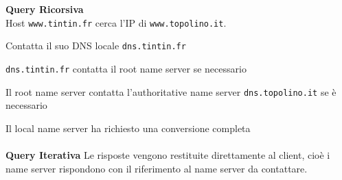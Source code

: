 \documentclass[10pt]{article}
\begin{document}
\textbf{Query Ricorsiva}\\
Host \texttt{www.tintin.fr} cerca l'IP di \texttt{www.topolino.it}.
\begin{list}{}{}
\item Contatta il suo DNS locale \texttt{dns.tintin.fr}
\item \texttt{dns.tintin.fr} contatta il root name server se necessario
\item Il root name server contatta l'authoritative name server \texttt{dns.topolino.it} se è necessario
\end{list}
Il local name server ha richiesto una conversione completa\\\\
\textbf{Query Iterativa} Le risposte vengono restituite direttamente al client, cioè i name server rispondono con il riferimento al name server da contattare.\\
\end{document}
